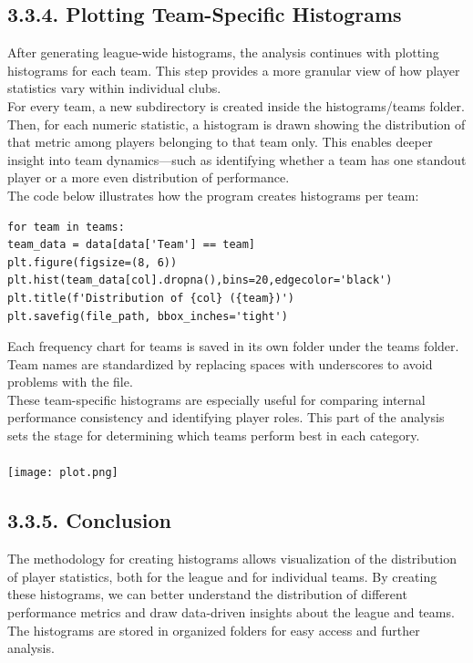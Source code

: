 \documentclass[a4paper,12pt]{article}
\begin{document}
\subsection*{\textbf{3.3.4. Plotting Team-Specific Histograms
}}
After generating league-wide histograms, the analysis continues with plotting histograms for each team. This step provides a more granular view of how player statistics vary within individual clubs.\\
For every team, a new subdirectory is created inside the histograms/teams folder. Then, for each numeric statistic, a histogram is drawn showing the distribution of that metric among players belonging to that team only. This enables deeper insight into team dynamics—such as identifying whether a team has one standout player or a more even distribution of performance.\\
The code below illustrates how the program creates histograms per team:
\begin{mdframed}
\begin{verbatim}
for team in teams:
team_data = data[data['Team'] == team]
plt.figure(figsize=(8, 6))
plt.hist(team_data[col].dropna(),bins=20,edgecolor='black')
plt.title(f'Distribution of {col} ({team})')
plt.savefig(file_path, bbox_inches='tight')
\end{verbatim}
\end{mdframed}
Each frequency chart for teams is saved in its own folder under the teams folder. Team names are standardized by replacing spaces with underscores to avoid problems with the file.\\
These team-specific histograms are especially useful for comparing internal performance consistency and identifying player roles. This part of the analysis sets the stage for determining which teams perform best in each category.\\\\
\texttt{[image: plot.png]}

\subsection*{\textbf{3.3.5. Conclusion
}}
The methodology for creating histograms allows visualization of the distribution of player statistics, both for the league and for individual teams. By creating these histograms, we can better understand the distribution of different performance metrics and draw data-driven insights about the league and teams. The histograms are stored in organized folders for easy access and further analysis.
\end{document}
